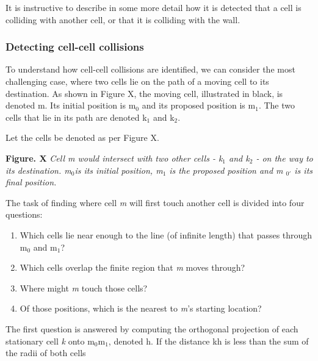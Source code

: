 \documentclass[12pt,a4paper]{report}
\begin{document}
It is instructive to describe in some more detail how it is detected 
that a cell is colliding with another cell, or that it is colliding with 
the wall.



\subsubsection{Detecting cell-cell 
collisions}
To understand how cell-cell collisions are identified, we can consider 
the most challenging case, where two cells lie on the path of a moving 
cell to its destination. As shown in Figure X, the moving cell, 
illustrated in black, is denoted m. Its initial position is m$_{0}$ 
and its proposed position is m$_{1}$. The two cells that lie in its 
path are denoted k$_{1}$ and k$_{2}$.



Let the cells be denoted as per Figure X.

\begin{figure}[H]
\centering
\end{figure}


{\bfseries Figure. X }{\itshape Cell m would intersect with two other 
cells - k$_{1}$ and k$_{2}$ - on the way to its destination. m$_{
0 }$is its initial position, m$_{1}$ is the proposed position and m
$_{0'}$ is its final position.}



The task of finding where cell {\itshape m} will first touch another 
cell is divided into four questions:

\begin{enumerate}
\item Which cells lie near enough to the line (of infinite length) that 
passes through m$_{0}$ and m$_{1}$?
\item Which cells overlap the finite region that {\itshape m }moves 
through?
\item Where might {\itshape m} touch those cells?
\item Of those positions, which is the nearest to {\itshape m}'s 
starting location?
\setcounter{numberedCntA}{\theenumi}
\end{enumerate}


The first question is answered by computing the orthogonal projection of 
each stationary cell {\itshape k} onto m$_{0}$m$_{1}$, denoted 
h. If the distance kh is less than the sum of the radii of both cells 
\end{document}
